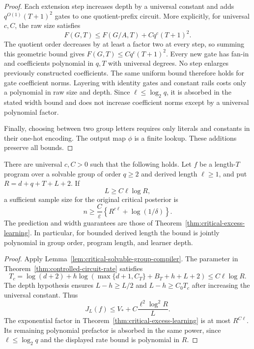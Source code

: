 \begin{proof}
Each extension step increases depth by a universal constant and adds
$q^{O(1)}(T+1)^2$ gates to one quotient-prefix circuit. More explicitly,
for universal $c,C$, the raw size satisfies
\[
 F(G,T)\le F(G/A,T)+Cq^c(T+1)^2.
\]
The quotient order decreases by at least a factor two at every step,
so summing this geometric bound gives $F(G,T)\le Cq^c(T+1)^2$.
Every new gate has fan-in and coefficients polynomial in $q,T$ with
universal degrees. No step enlarges previously constructed coefficients.
The same uniform bound therefore holds for gate coefficient norms. Layering with identity gates and constant rails costs
only a polynomial in raw size and depth. Since $\ell\le\log_2q$, it is
absorbed in the stated width bound and does not increase coefficient
norms except by a universal polynomial factor.

Finally, choosing between two group letters requires only literals and
constants in their one-hot encoding. The output map $\phi$ is a finite
lookup. These additions preserve all bounds.
\end{proof}

\begin{theorem}
\label{thm:critical-solvable-group-learning}
There are universal $c,C>0$ such that the following holds. Let $f$ be
a length-$T$ program over a solvable group of order $q\ge2$ and derived
length $\ell\ge1$, and put $R=d+q+T+L+2$. If
\[
 L\ge C\ell\log R,
\]
a sufficient sample size for the original critical posterior is
\[
 n\ge\frac C\varepsilon
          \left\{R^{c\ell}+\log(1/\delta)\right\}.
\]
The prediction and width guarantees are those of
Theorem~\ref{thm:critical-excess-learning}. In particular, for bounded
derived length the bound is jointly polynomial in group order, program
length, and learner depth.
\end{theorem}

\begin{proof}
Apply Lemma~\ref{lem:critical-solvable-group-compiler}. The parameter in
Theorem~\ref{thm:controlled-circuit-rate} satisfies
\[
 T_c=\log(d+2)+h\log(\max\{d+1,C_T\}+B_T+h+L+2)
       \le C\ell\log R.
\]
The depth hypothesis ensures $L-h\ge L/2$ and $L-h\ge C_0T_c$ after
increasing the universal constant. Thus
\[
 J_L(f)\le V_*+C\frac{\ell^2\log^2R}{L}.
\]
The exponential factor in
Theorem~\ref{thm:critical-excess-learning} is at most $R^{C\ell}$.
Its remaining polynomial prefactor is absorbed in the same power,
since $\ell\le\log_2q$ and the displayed rate bound is polynomial in
$R$.
\end{proof}

